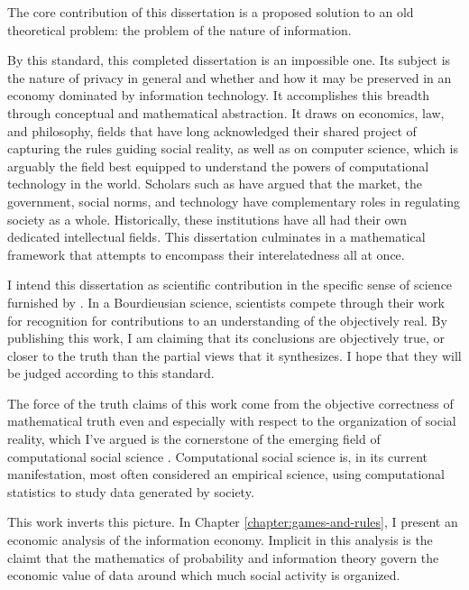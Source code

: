\documentclass[../thesis.tex]{subfiles}
\begin{document}
 The core contribution of this dissertation is a proposed
 solution to an old theoretical problem: the problem of the
 nature of information.
 
 
 
 By this standard, this completed dissertation is an impossible
 one.
 Its subject is the nature of privacy in general and whether and how it may be preserved in an economy dominated by information technology.
 It accomplishes this breadth through conceptual and mathematical
 abstraction.
 It draws on economics, law, and philosophy, fields that have long acknowledged their shared project of capturing the rules guiding social reality, as well as on computer science, which is arguably the field best equipped to understand the powers of computational technology in the world.
 Scholars such as \citet{lessig1999code} have argued that the market, the government, social norms, and technology have complementary roles in regulating society as a whole.
 Historically, these institutions have all had their own dedicated intellectual fields.
 This dissertation culminates in a mathematical framework that attempts to encompass their interelatedness all at once.

 I intend this dissertation as scientific contribution
 in the specific sense of science furnished by
 \citet{bourdieu2004science}.
 In a Bourdieusian science, scientists compete through their work
 for recognition for contributions to an understanding of the
 objectively real.
 By publishing this work, I am claiming that its conclusions
 are objectively true, or closer to the truth than the partial
 views that it synthesizes.
 I hope that they will be judged according to this standard.

 The force of the truth claims of this work come from the
 objective correctness of mathematical truth even and especially
 with respect to the organization of social reality, which I've
 argued is the cornerstone of the emerging field of
 computational social science \citep{benthall2016philosophy}.
 Computational social science is, in its current manifestation,
 most often considered an empirical science, using computational
 statistics to study data generated by society.

 This work inverts this picture.
 In Chapter \ref{chapter:games-and-rules}, I present
 an economic analysis of the information economy.
 Implicit in this analysis is the claimt that
 the mathematics of probability and information theory
 govern the economic value of data around which much
 social activity is organized.
\end{document}
